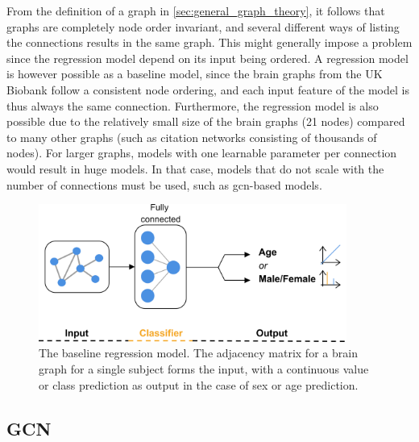 From the definition of a graph in \ref{sec:general_graph_theory}, it follows that graphs are completely node order invariant, and several different ways of listing the connections results in the same graph. This might generally impose a problem since the regression model depend on its input being ordered. A regression model is however possible as a baseline model, since the brain graphs from the UK Biobank follow a consistent node ordering, and each input feature of the model is thus always the same connection. Furthermore, the regression model is also possible due to the relatively small size of the brain graphs (21 nodes) compared to many other graphs (such as citation networks consisting of thousands of nodes). For larger graphs, models with one learnable parameter per connection would result in huge models. In that case, models that do not scale with the number of connections must be used, such as \acrshort{gcn}-based models. 

%         

\begin{figure}[!htbp]
    \centering
    \includegraphics[width=0.9\textwidth]{chapters/images_methods/ffnn_v2.png}
    \caption{The baseline regression model. The adjacency matrix for a brain graph for a single subject forms the input, with a continuous value or class prediction as output in the case of sex or age prediction.}
    \label{fig:Graph_class_baseline}
\end{figure}

\subsection{GCN}


